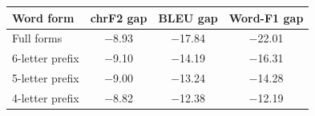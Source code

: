 \begin{tabular}{@{}lccc@{}}
\toprule
Word form & chrF2 gap & BLEU gap & Word-F1 gap \\
\midrule
Full forms & $-$8.93 & $-$17.84 & $-$22.01 \\
6-letter prefix & $-$9.10 & $-$14.19 & $-$16.31 \\
5-letter prefix & $-$9.00 & $-$13.24 & $-$14.28 \\
4-letter prefix & $-$8.82 & $-$12.38 & $-$12.19 \\
\bottomrule
\end{tabular}

